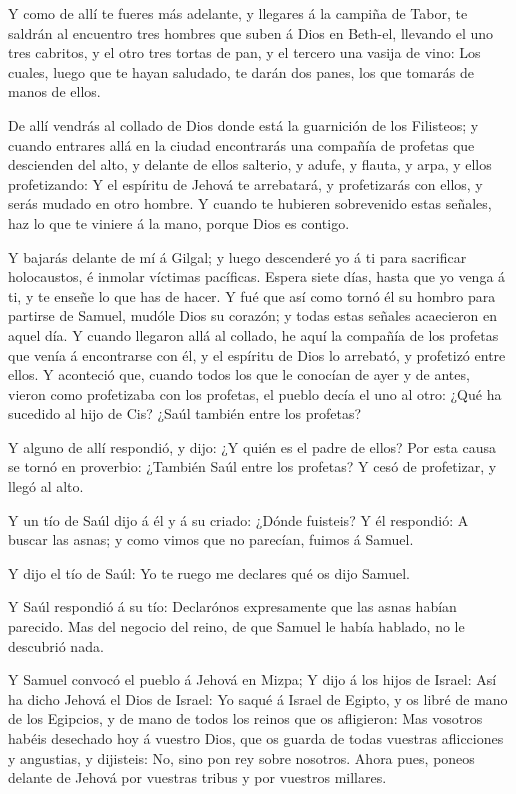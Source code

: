  Y como de allí te fueres más adelante, y llegares á la
campiña de Tabor, te saldrán al encuentro tres hombres que suben á Dios
en Beth-el, llevando el uno tres cabritos, y el otro tres tortas de pan,
y el tercero una vasija de vino:  Los cuales, luego que te
hayan saludado, te darán dos panes, los que tomarás de manos de ellos.

 De allí vendrás al collado de Dios donde está la guarnición
de los Filisteos; y cuando entrares allá en la ciudad encontrarás una
compañía de profetas que descienden del alto, y delante de ellos
salterio, y adufe, y flauta, y arpa, y ellos profetizando: 
Y el espíritu de Jehová te arrebatará, y profetizarás con ellos, y serás
mudado en otro hombre.  Y cuando te hubieren sobrevenido
estas señales, haz lo que te viniere á la mano, porque Dios es contigo.

 Y bajarás delante de mí á Gilgal; y luego descenderé yo á
ti para sacrificar holocaustos, é inmolar víctimas pacíficas. Espera
siete días, hasta que yo venga á ti, y te enseñe lo que has de hacer.
 Y fué que así como tornó él su hombro para partirse de
Samuel, mudóle Dios su corazón; y todas estas señales acaecieron en
aquel día.  Y cuando llegaron allá al collado, he aquí la
compañía de los profetas que venía á encontrarse con él, y el espíritu
de Dios lo arrebató, y profetizó entre ellos.  Y aconteció
que, cuando todos los que le conocían de ayer y de antes, vieron como
profetizaba con los profetas, el pueblo decía el uno al otro: ¿Qué ha
sucedido al hijo de Cis? ¿Saúl también entre los profetas?

 Y alguno de allí respondió, y dijo: ¿Y quién es el padre
de ellos? Por esta causa se tornó en proverbio: ¿También Saúl entre los
profetas?  Y cesó de profetizar, y llegó al alto.

 Y un tío de Saúl dijo á él y á su criado: ¿Dónde fuisteis?
Y él respondió: A buscar las asnas; y como vimos que no parecían, fuimos
á Samuel.

 Y dijo el tío de Saúl: Yo te ruego me declares qué os dijo
Samuel.

 Y Saúl respondió á su tío: Declarónos expresamente que las
asnas habían parecido. Mas del negocio del reino, de que Samuel le había
hablado, no le descubrió nada.

 Y Samuel convocó el pueblo á Jehová en Mizpa;
 Y dijo á los hijos de Israel: Así ha dicho Jehová el Dios
de Israel: Yo saqué á Israel de Egipto, y os libré de mano de los
Egipcios, y de mano de todos los reinos que os afligieron: 
Mas vosotros habéis desechado hoy á vuestro Dios, que os guarda de todas
vuestras aflicciones y angustias, y dijisteis: No, sino pon rey sobre
nosotros. Ahora pues, poneos delante de Jehová por vuestras tribus y por
vuestros millares.

